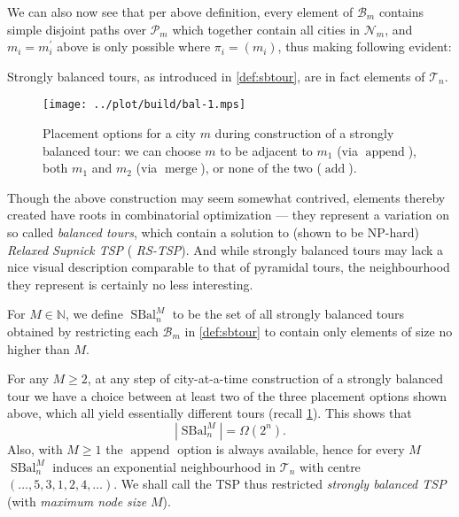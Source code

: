 \documentclass[index=totoc,bibliography=totoc]{scrartcl}
\newcommand{\annotation}[1]{\marginpar{\small\itshape\color{green}#1}}
\numberwithin{equation}{section}
\numberwithin{figure}{section}
\numberwithin{table}{section}
\let\defstyle\itshape
\begin{document}
We can also now see that per above definition, every element of
$\mathcal{B}_m$ contains simple disjoint paths over $\mathcal{P}_m$ which
together contain all cities in $\mathcal{N}_m$, and $m_i = m_i^\prime$ above is
only possible where $\pi_i = (m_i)$, thus making following evident:
\begin{remark}
  Strongly balanced tours, as introduced in \cref{def:sbtour},
  are in fact elements of $\mathcal{T}_n$.
\end{remark}

\begin{figure}[hbt]
  \centering
  \texttt{[image: ../plot/build/bal-1.mps]}
  \caption{%
    Placement options for a city $m$ during construction of a strongly
    balanced tour: we can choose $m$ to be adjacent to $m_1$ (via $\operatorname{append}$),
    both $m_1$ and $m_2$ (via $\operatorname{merge}$), or none of the two ($\operatorname{add}$).
 }
 \label{fig:sbopt}
\end{figure}

Though the above construction may seem somewhat contrived, elements thereby
created have roots in combinatorial optimization --- they represent a
variation on so called {\defstyle balanced tours}, which contain a solution
to (shown to be NP-hard) {\defstyle Relaxed Supnick TSP} ({\defstyle
  RS-TSP}).
\annotation{Citation!}
And while strongly balanced tours may lack a nice visual description
comparable to that of pyramidal tours, the neighbourhood they represent is
certainly no less interesting.

\begin{define}
For $M \in \mathbb{N}$, we define $\operatorname{SBal}_n^M$ to be the set of all
strongly balanced tours obtained by restricting each $\mathcal{B}_m$ in \cref{def:sbtour}
to contain only elements of size no higher than $M$.
\end{define}

\begin{remark}
  For any $M \geq 2$, at any step of city-at-a-time construction of a
  strongly balanced tour we have a choice between at least two of the three
  placement options shown above, %
  which all yield essentially different tours (recall \cref{fig:sbopt}).  This shows that
  \[
    \left|\operatorname{SBal}_n^M\right| = \Omega\left(2^n\right).
  \]
  Also, with $M \geq 1$ the $\operatorname{append}$ option is always available,
  hence for every $M$ $\operatorname{SBal}_n^M$ induces an exponential neighbourhood
  in $\mathcal{T}_n$ with centre $\left(\ldots,5,3,1,2,4,\ldots\right)$.
  We shall call the TSP thus restricted {\defstyle strongly balanced TSP}
  (with {\defstyle maximum node size} $M$).
\end{remark}
\end{document}
